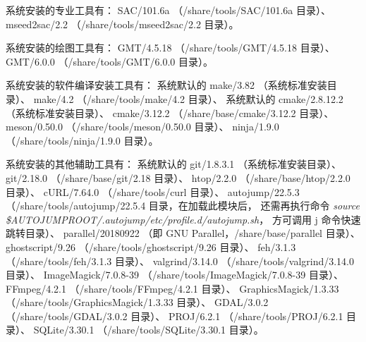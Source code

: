 \documentclass[UTF8]{ctexart}
\begin{document}
系统安装的专业工具有：\newline
SAC/101.6a （/share/tools/SAC/101.6a 目录）、\newline
mseed2sac/2.2 （/share/tools/mseed2sac/2.2 目录）。
\bigskip

系统安装的绘图工具有：\newline
GMT/4.5.18 （/share/tools/GMT/4.5.18 目录）、\newline
GMT/6.0.0 （/share/tools/GMT/6.0.0 目录）。
\bigskip

系统安装的软件编译安装工具有：\newline
系统默认的 make/3.82 （系统标准安装目录）、\newline
make/4.2 （/share/tools/make/4.2 目录）、\newline
系统默认的 cmake/2.8.12.2 （系统标准安装目录）、\newline
cmake/3.12.2 （/share/base/cmake/3.12.2 目录）、\newline
meson/0.50.0 （/share/tools/meson/0.50.0 目录）、\newline
ninja/1.9.0 （/share/tools/ninja/1.9.0 目录）。
\bigskip

系统安装的其他辅助工具有：\newline
系统默认的 git/1.8.3.1 （系统标准安装目录）、\newline
git/2.18.0 （/share/base/git/2.18 目录）、\newline
htop/2.2.0 （/share/base/htop/2.2.0 目录）、\newline
cURL/7.64.0 （/share/tools/curl 目录）、\newline
autojump/22.5.3 （/share/tools/autojump/22.5.4 目录，在加载此模块后，
还需再执行命令 {\em source \$AUTOJUMPROOT/.autojump/etc/profile.d/autojump.sh}，
方可调用 j 命令快速跳转目录）、\newline
parallel/20180922 （即 GNU Parallel，/share/base/parallel 目录）、\newline
ghostscript/9.26 （/share/tools/ghostscript/9.26 目录）、\newline
feh/3.1.3 （/share/tools/feh/3.1.3 目录）、\newline
valgrind/3.14.0 （/share/tools/valgrind/3.14.0 目录）、\newline
ImageMagick/7.0.8-39 （/share/tools/ImageMagick/7.0.8-39 目录）、\newline
FFmpeg/4.2.1 （/share/tools/FFmpeg/4.2.1 目录）、\newline
GraphicsMagick/1.3.33 （/share/tools/GraphicsMagick/1.3.33 目录）、\newline
GDAL/3.0.2 （/share/tools/GDAL/3.0.2 目录）、\newline
PROJ/6.2.1 （/share/tools/PROJ/6.2.1 目录）、\newline
SQLite/3.30.1 （/share/tools/SQLite/3.30.1 目录）。
\end{document}
